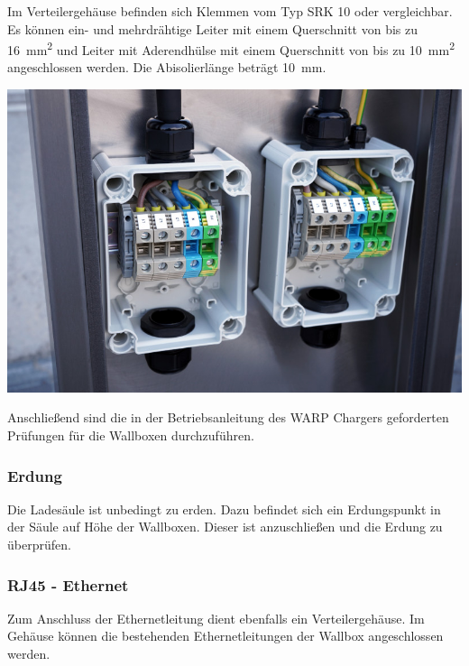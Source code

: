 \documentclass[a4paper,10pt]{article}
\begin{document}
\begin{multicols*}{2}
	Im Verteilergehäuse befinden sich Klemmen vom Typ SRK 10
	oder vergleichbar. Es können ein- und mehrdrähtige Leiter mit einem Querschnitt von bis zu
	\SI{16}{\square\milli\meter} und Leiter mit Aderendhülse mit einem
	Querschnitt von bis zu \SI{10}{\square\milli\meter} angeschlossen werden.
	Die Abisolierlänge beträgt \SI{10}{\milli\meter}.


	\begin{center}
		\includegraphics[width=\linewidth]{./img/warp-charger-stand-clamps}
	\end{center}

	Anschließend sind die in der Betriebsanleitung des WARP Chargers geforderten Prüfungen für die
	Wallboxen durchzuführen.

	\subsubsection{Erdung}
	Die Ladesäule ist unbedingt zu erden. Dazu befindet sich ein Erdungspunkt in
	der Säule auf Höhe der Wallboxen. Dieser ist anzuschließen und die Erdung zu
	überprüfen.

	\subsubsection{RJ45 - Ethernet}
	Zum Anschluss der Ethernetleitung dient ebenfalls ein Verteilergehäuse.
	Im Gehäuse können die bestehenden Ethernetleitungen der Wallbox
	angeschlossen werden.


\end{multicols*}
\end{document}
